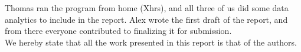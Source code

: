 \documentclass[12pt]{article}
\begin{document}
Thomas ran the program from home (Xhrs), and all three of us did some data analytics to include in the report. Alex wrote the first draft of the report, and from there everyone contributed to finalizing it for submission.\\

We hereby state that all the work presented in this report is that of the authors.












\end{document}

